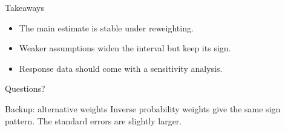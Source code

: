 \documentclass[aspectratio=169]{beamer}
\begin{document}
\begin{frame}{Takeaways}
  \begin{itemize}
    \item The main estimate is stable under reweighting.
    \item Weaker assumptions widen the interval but keep its sign.
    \item Response data should come with a sensitivity analysis.
  \end{itemize}
\end{frame}

\begin{frame}[standout]
  Questions?
\end{frame}

\appendix

\begin{frame}[noframenumbering]{Backup: alternative weights}
  Inverse probability weights give the same sign pattern.
  The standard errors are slightly larger.
\end{frame}
\end{document}
